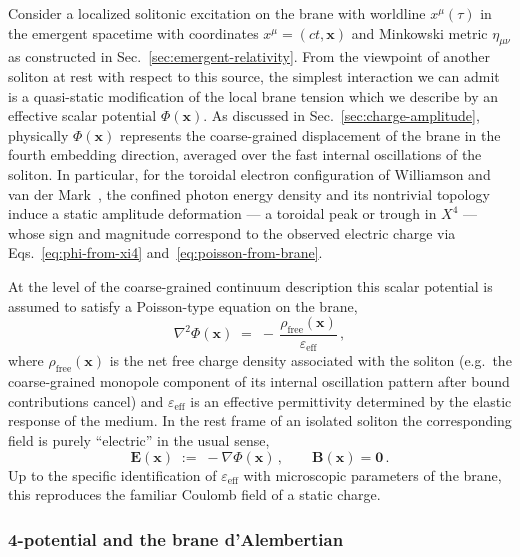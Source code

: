 Consider a localized solitonic excitation on the brane with worldline
$x^\mu(\tau)$ in the emergent spacetime with coordinates
$x^\mu = (ct,\mathbf{x})$ and Minkowski metric $\eta_{\mu\nu}$ as
constructed in Sec.~\ref{sec:emergent-relativity}. From the viewpoint
of another soliton at rest with respect to this source, the simplest
interaction we can admit is a quasi-static modification of the local
brane tension which we describe by an effective scalar potential
$\Phi(\mathbf{x})$. As discussed in Sec.~\ref{sec:charge-amplitude},
physically $\Phi(\mathbf{x})$ represents the coarse-grained displacement
of the brane in the fourth embedding direction, averaged over the fast
internal oscillations of the soliton. In particular, for the toroidal
electron configuration of Williamson and van der
Mark~\cite{Williamson1997}, the confined photon energy density and its
nontrivial topology induce a static amplitude deformation --- a toroidal
peak or trough in $X^4$ --- whose sign and magnitude correspond to the
observed electric charge via Eqs.~\eqref{eq:phi-from-xi4}
and~\eqref{eq:poisson-from-brane}.

At the level of the coarse-grained continuum description this scalar
potential is assumed to satisfy a Poisson-type equation on the brane,
\begin{equation}
  \nabla^2 \Phi(\mathbf{x})
  \;=\;
  -\,\frac{\rho_{\text{free}}(\mathbf{x})}{\varepsilon_{\mathrm{eff}}}\,,
  \label{eq:poisson-brane}
\end{equation}
where $\rho_{\text{free}}(\mathbf{x})$ is the net free charge density
associated with the soliton (e.g.\ the coarse-grained monopole component
of its internal oscillation pattern after bound contributions cancel) and
$\varepsilon_{\mathrm{eff}}$ is an effective permittivity determined by
the elastic response of the medium.
In the rest frame of an isolated soliton the corresponding field
is purely ``electric'' in the usual sense,
\begin{equation}
  \mathbf{E}(\mathbf{x})
  \;:=\;
  -\nabla \Phi(\mathbf{x})\,,
  \qquad
  \mathbf{B}(\mathbf{x}) = \mathbf{0}\,.
  \label{eq:rest-electric}
\end{equation}
Up to the specific identification of $\varepsilon_{\mathrm{eff}}$ with
microscopic parameters of the brane, this reproduces the familiar
Coulomb field of a static charge.

\subsubsection{4-potential and the brane d'Alembertian}

